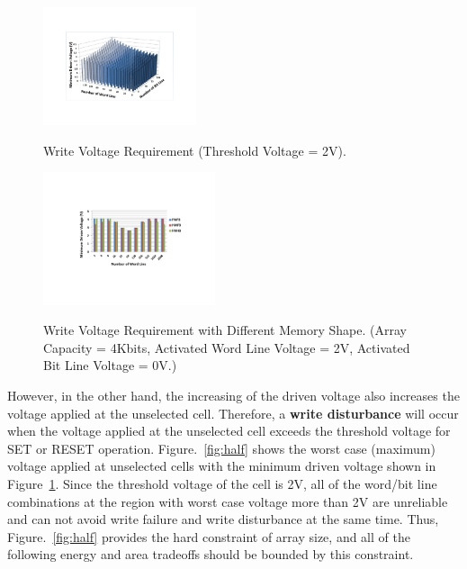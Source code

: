 
\begin{figure}%
\centering
  \includegraphics[width=0.4\textwidth]{./figures/worst_v3.pdf}\\
  \caption{Write Voltage Requirement (Threshold Voltage = 2V). }\label{fig:worst_v}
\end{figure}


\begin{figure}%
\centering
  \includegraphics[width=0.45\textwidth]{./figures/shape3.pdf}\\
  \caption{Write Voltage Requirement with Different Memory Shape. (Array Capacity = 4Kbits, Activated Word Line Voltage = 2V, Activated Bit Line Voltage = 0V.)}\label{fig:shape}
\end{figure}

However, in the other hand, the increasing of the driven voltage also
increases the voltage applied at the unselected cell. Therefore, a
\textbf{write disturbance} will occur when the voltage applied at the
unselected cell exceeds the threshold voltage for SET or RESET operation.
Figure.~\ref{fig:half} shows the worst case (maximum) voltage applied at
unselected cells with the minimum driven voltage shown in
Figure~\ref{fig:worst_v}. Since the threshold voltage of the cell is 2V,
all of the word/bit line combinations at the region with worst case
voltage more than 2V are unreliable and can not avoid write failure and
write disturbance at the same time. Thus, Figure.~\ref{fig:half} provides
the hard constraint of array size, and all of the following energy and
area tradeoffs should be bounded by this constraint.

